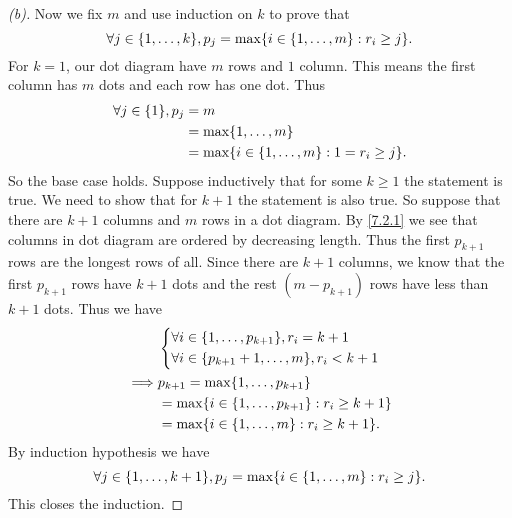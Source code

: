 \begin{proof}[(b)]
  Now we fix \(m\) and use induction on \(k\) to prove that
  \[
    \forall j \in \set{1, \dots, k}, p_j = \max \set{i \in \set{1, \dots, m} : r_i \geq j}.
  \]
  For \(k = 1\), our dot diagram have \(m\) rows and \(1\) column.
  This means the first column has \(m\) dots and each row has one dot.
  Thus
  \begin{align*}
    \forall j \in \set{1}, p_j & = m                                                    \\
                               & = \max \set{1, \dots, m}                               \\
                               & = \max \set{i \in \set{1, \dots, m} : 1 = r_i \geq j}.
  \end{align*}
  So the base case holds.
  Suppose inductively that for some \(k \geq 1\) the statement is true.
  We need to show that for \(k + 1\) the statement is also true.
  So suppose that there are \(k + 1\) columns and \(m\) rows in a dot diagram.
  By \cref{7.2.1} we see that columns in dot diagram are ordered by decreasing length.
  Thus the first \(p_{k + 1}\) rows are the longest rows of all.
  Since there are \(k + 1\) columns, we know that the first \(p_{k + 1}\) rows have \(k + 1\) dots and the rest \((m - p_{k + 1})\) rows have less than \(k + 1\) dots.
  Thus we have
  \begin{align*}
             & \begin{dcases}
                 \forall i \in \set{1, \dots, p_{k + 1}}, r_i = k + 1 \\
                 \forall i \in \set{p_{k + 1} + 1, \dots, m}, r_i < k + 1
               \end{dcases} \\
    \implies & p_{k + 1} = \max \set{1, \dots, p_{k + 1}}                                   \\
             & = \max \set{i \in \set{1, \dots, p_{k + 1}} : r_i \geq k + 1}                \\
             & = \max \set{i \in \set{1, \dots, m} : r_i \geq k + 1}.
  \end{align*}
  By induction hypothesis we have
  \[
    \forall j \in \set{1, \dots, k + 1}, p_j = \max \set{i \in \set{1, \dots, m} : r_i \geq j}.
  \]
  This closes the induction.
\end{proof}


